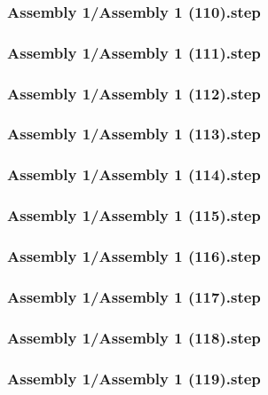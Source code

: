 \documentclass[a4paper,12pt]{article}
\begin{document}
\subsubsection{Assembly 1/Assembly 1 (110).step}

\subsubsection{Assembly 1/Assembly 1 (111).step}

\subsubsection{Assembly 1/Assembly 1 (112).step}

\subsubsection{Assembly 1/Assembly 1 (113).step}

\subsubsection{Assembly 1/Assembly 1 (114).step}

\subsubsection{Assembly 1/Assembly 1 (115).step}

\subsubsection{Assembly 1/Assembly 1 (116).step}

\subsubsection{Assembly 1/Assembly 1 (117).step}

\subsubsection{Assembly 1/Assembly 1 (118).step}

\subsubsection{Assembly 1/Assembly 1 (119).step}

\end{document}

